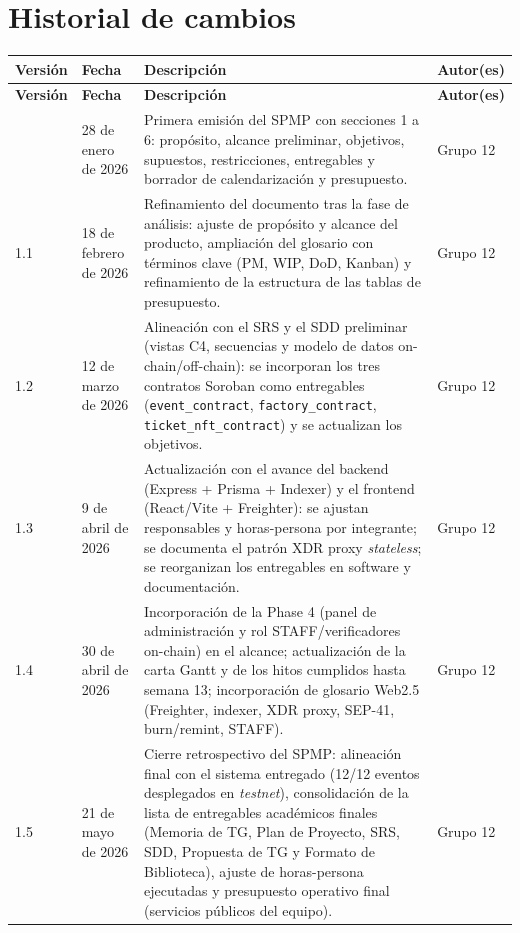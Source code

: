 \documentclass[12pt,oneside]{report}
\newcommand{\team}{Grupo 12}
\begin{document}
  \section*{Historial de cambios}
  \begin{longtable}{@{}p{2cm} p{3cm} p{7.5cm} p{2.5cm}@{}}
    \toprule
    \textbf{Versión} & \textbf{Fecha} & \textbf{Descripción} & \textbf{Autor(es)}\\
    \midrule
    \endfirsthead
    \toprule
    \textbf{Versión} & \textbf{Fecha} & \textbf{Descripción} & \textbf{Autor(es)}\\
    \midrule
    \endhead
    \bottomrule
    \endfoot
    1.0 & 28 de enero de 2026 & Primera emisión del SPMP con secciones 1 a 6: propósito, alcance preliminar, objetivos, supuestos, restricciones, entregables y borrador de calendarización y presupuesto. & \team\\
    1.1 & 18 de febrero de 2026 & Refinamiento del documento tras la fase de análisis: ajuste de propósito y alcance del producto, ampliación del glosario con términos clave (PM, WIP, DoD, Kanban) y refinamiento de la estructura de las tablas de presupuesto. & \team\\
    1.2 & 12 de marzo de 2026 & Alineación con el SRS y el SDD preliminar (vistas C4, secuencias y modelo de datos on-chain/off-chain): se incorporan los tres contratos Soroban como entregables (\texttt{event\_contract}, \texttt{factory\_contract}, \texttt{ticket\_nft\_contract}) y se actualizan los objetivos. & \team\\
    1.3 & 9 de abril de 2026 & Actualización con el avance del backend (Express + Prisma + Indexer) y el frontend (React/Vite + Freighter): se ajustan responsables y horas-persona por integrante; se documenta el patrón XDR proxy \textit{stateless}; se reorganizan los entregables en software y documentación. & \team\\
    1.4 & 30 de abril de 2026 & Incorporación de la Phase 4 (panel de administración y rol STAFF/verificadores on-chain) en el alcance; actualización de la carta Gantt y de los hitos cumplidos hasta semana 13; incorporación de glosario Web2.5 (Freighter, indexer, XDR proxy, SEP-41, burn/remint, STAFF). & \team\\
    1.5 & 21 de mayo de 2026 & Cierre retrospectivo del SPMP: alineación final con el sistema entregado (12/12 eventos desplegados en \textit{testnet}), consolidación de la lista de entregables académicos finales (Memoria de TG, Plan de Proyecto, SRS, SDD, Propuesta de TG y Formato de Biblioteca), ajuste de horas-persona ejecutadas y presupuesto operativo final (servicios públicos del equipo). & \team\\
  \end{longtable}
\end{document}
